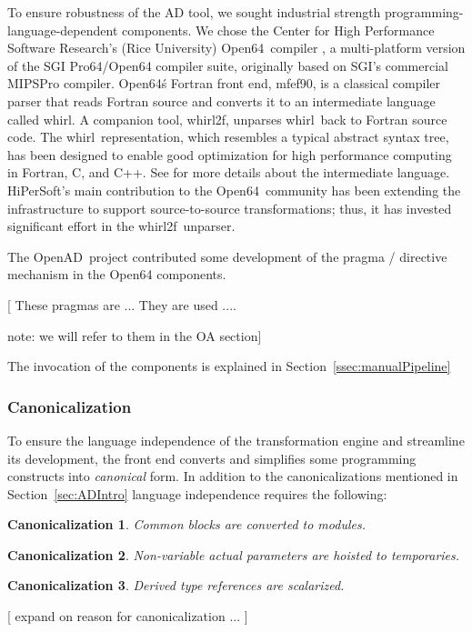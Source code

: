 \documentclass[acmtocl,acmnow]{acmtrans2m}
\newcommand{\mfefninety}{mfef90}
\newcommand{\OpenAD}{OpenAD}
\newcommand{\OpenSixtyFour}{Open64}
\newcommand{\whirl}{whirl}
\newcommand{\whirlTof}{whirl2f}
\newcommand{\refsec}[1]{Section~\ref{#1}}
\newtheorem{Can}{Canonicalization}
\begin{document}
To ensure robustness of the AD tool, we sought industrial strength
programming-language-dependent components.  We chose the Center for
High Performance Software Research's (Rice University) \OpenSixtyFour\
compiler \cite{open64Web}, 
a multi-platform version of the SGI Pro64/Open64 compiler
suite, originally based on SGI's commercial MIPSPro compiler.  
\OpenSixtyFour\'s Fortran
front end, \mfefninety, is a classical compiler parser that reads Fortran
source and converts it to an intermediate language called \whirl.  
A companion tool, \whirlTof, unparses \whirl\ back to Fortran source
code.  The \whirl\ representation, 
which resembles a typical abstract syntax tree, has been
designed to enable good optimization for high performance computing in
Fortran, C, and C++. See \cite{whirl-stuff} for more details about the
intermediate language. 
HiPerSoft's main contribution to the \OpenSixtyFour\ 
community has been extending the infrastructure to support
source-to-source transformations; thus, it has invested significant
effort in the \whirlTof\ unparser.

The \OpenAD\ project contributed some development of the pragma /
directive mechanism in the Open64 components.

{\color{Red} [ These pragmas are ...  They  are used ....

note: we will refer to them in the OA section] }

The invocation of the components is explained  in \refsec{ssec:manualPipeline}

\subsubsection{Canonicalization}\label{sssec:Canonicalization}
To ensure 
 the language independence of the transformation engine and  streamline
its development, 
the front end converts and simplifies some programming constructs into 
\emph{canonical} form. 
In addition to the canonicalizations mentioned in 
\refsec{sec:ADIntro} language independence requires the following: 
\begin{Can}\label{can:comBlock}
Common blocks are converted to modules.
\end{Can}
\begin{Can}\label{can:param}
Non-variable actual parameters are hoisted to temporaries.
\end{Can}
\begin{Can}\label{can:scalar}
 Derived type references are scalarized.
\end{Can}	
{\color{Red}
[ expand on reason for canonicalization ... ]
}
\end{document}

